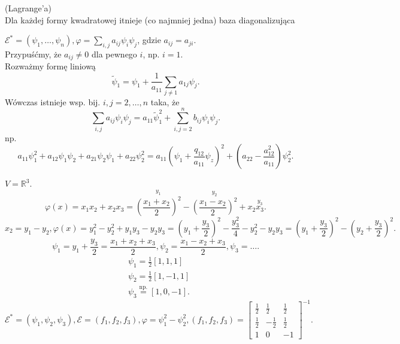 \documentclass[../main.tex]{subfiles}
\begin{document}
    \begin{tw}
        (Lagrange'a)\\
        Dla każdej formy kwadratowej itnieje (co najmniej jedna) baza diagonalizująca
    \end{tw}
    \begin{dowod}
        $\mathcal{E}^* = \left( \psi_1,\ldots,\psi_n \right) , \varphi = \sum_{i,j} a_{ij} \psi_i \psi_j$, gdzie $a_{ij} = a_{ji}$.\\
        Przypuśćmy, że $a_{ij}\neq 0$ dla pewnego $i$, np. $i = 1$.\\
        Rozważmy formę liniową
        \[
        \tilde \psi_1 = \psi_1 + \frac{1}{a_{11}}\sum_{j\neq 1} a_{1j}\psi_j
        .\]
        Wówczas istnieje wsp. bij. $i,j=2,\ldots,n$ taka, że \[
        \sum_{i,j} a_{ij}\psi_i \psi_j = a_{11} \tilde \psi_1^2 + \sum_{i,j=2}^n b_{ij}\psi_i \psi_j
        .\]
        np.\[
            a_{11}\psi_1^2 + a_{12}\psi_1\psi_2 + a_{21}\psi_2\psi_1 + a_{22}\psi_2^2 = a_{11}(\psi_1 + \frac{q_{12}}{a_{11}}\psi_z)^2 + (a_{22} - \frac{a_{12}^2}{a_{11}})\psi_2^2
        .\]
    \end{dowod}
    \begin{przyklad}
        $V=\mathbb{R}^3$.
        \[
            \varphi(x) = x_1x_2 + x_2x_3 = \overset{y_1}{\left(\frac{x_1+x_2}{2}\right)^2} - \overset{y_2}{\left( \frac{x_1-x_2}{2} \right) ^2} + x_2\overset{y_3}{x_3}
        .\]
        \[
            x_2 = y_1-y_2, \varphi(x) = y_1^2 - y_2^2 + y_1y_3 - y_2y_3 = (y_1+\frac{y_3}{2})^2 - \frac{y_3^2}{4} - y_2^2 - y_2y_3 = (y_1+\frac{y_3}{2})^2 - (y_2+\frac{y_3}{2})^2
        .\]
        \[
            \psi_1 = y_1+\frac{y_3}{2} = \frac{x_1+x_2+x_3}{2}, \psi_2 = \frac{x_1-x_2+x_3}{2}, \psi_3 = \ldots
        .\]
        \begin{align*}
            &\psi_1 = \frac{1}{2}\left[ 1,1,1 \right] \\
            &\psi_2 = \frac{1}{2}\left[ 1,-1,1 \right] \\
            &\psi_3 \overset{\text{np.}}{=} \left[ 1,0,-1 \right]
        .\end{align*}
        \[
            \mathcal{E}^* = \left( \psi_1, \psi_2, \psi_3 \right) , \mathcal{E} = \left( f_1,f_2,f_3 \right) , \varphi = \psi_1^2 - \psi_2^2, \left( f_1,f_2,f_3 \right) = \begin{bmatrix} \frac{1}{2}&\frac{1}{2}&\frac{1}{2}\\ \frac{1}{2}&-\frac{1}{2}&\frac{1}{2}\\ 1&0&-1 \end{bmatrix} ^{-1}
        .\]
    \end{przyklad}
\end{document}
